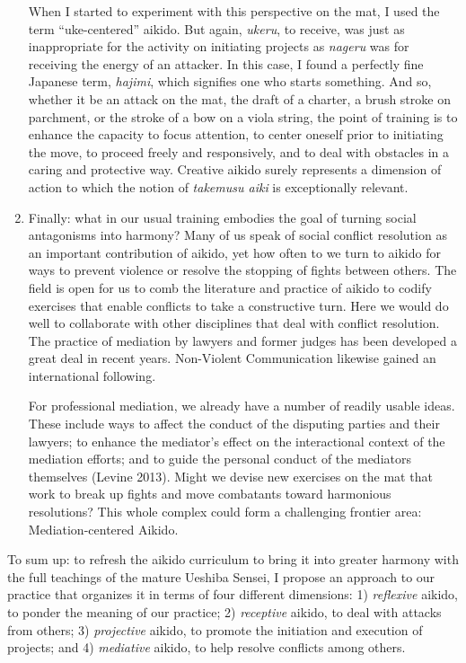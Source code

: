 \begin{enumerate}
When I started to experiment with this perspective on the mat, I used the term ``uke-centered'' aikido. But again, \emph{ukeru}, to receive, was just as inappropriate for the activity on initiating projects as \emph{nageru} was for receiving the energy of an attacker. In this case, I found a perfectly fine Japanese term, \emph{hajimi}, which signifies one who starts something. And so, whether it be an attack on the mat, the draft of a charter, a brush stroke on parchment, or the stroke of a bow on a viola string, the point of training is to enhance the capacity to focus attention, to center oneself prior to initiating the move, to proceed freely and responsively, and to deal with obstacles in a caring and protective way. Creative aikido surely represents a dimension of action to which the notion of \emph{takemusu aiki} is exceptionally relevant.
\item Finally: what in our usual training embodies the goal of turning social antagonisms into harmony? Many of us speak of social conflict resolution as an important contribution of aikido, yet how often to we turn to aikido for ways to prevent violence or resolve the stopping of fights between others. The field is open for us to comb the literature and practice of aikido to codify exercises that enable conflicts to take a constructive turn. Here we would do well to collaborate with other disciplines that deal with conflict resolution. The practice of mediation by lawyers and former judges has been developed a great deal in recent years. Non-Violent Communication likewise gained an international following. 

For professional mediation, we already have a number of readily usable ideas. These include ways to affect the conduct of the disputing parties and their lawyers; to enhance the mediator's effect on the interactional context of the mediation efforts; and to guide the personal conduct of the mediators themselves (Levine 2013). Might we devise new exercises on the mat that work to break up fights and move combatants toward harmonious resolutions? This whole complex could form a challenging frontier area: Mediation-centered Aikido.
\end{enumerate}

To sum up: to refresh the aikido curriculum to bring it into greater harmony with the full teachings of the mature Ueshiba Sensei, I propose an approach to our practice that organizes it in terms of four different dimensions: 1) \emph{reflexive} aikido, to ponder the meaning of our practice; 2) \emph{receptive} aikido, to deal with attacks from others; 3) \emph{projective} aikido, to promote the initiation and execution of projects; and 4) \emph{mediative} aikido, to help resolve conflicts among others. 

